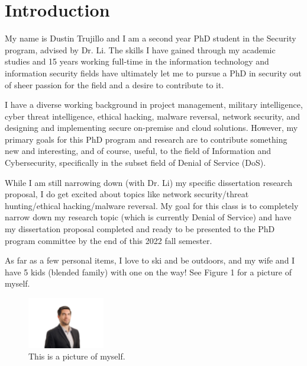 \date{}
\author{Dustin J. Trujillo}

\maketitle


\section{Introduction}

My name is Dustin Trujillo and I am a second year PhD student in the Security program, advised by Dr. Li. The skills I have gained through my academic studies and 15 years working full-time in the information technology and information security fields have ultimately let me to pursue a PhD in security out of sheer passion for the field and a desire to contribute to it.

I have a diverse working background in project management, military intelligence, cyber threat intelligence, ethical hacking, malware reversal, network security, and designing and implementing secure on-premise and cloud solutions. However, my primary goals for this PhD program and research are to contribute something new and interesting, and of course, useful, to the field of Information and Cybersecurity, specifically in the subset field of Denial of Service (DoS).

While I am still narrowing down (with Dr. Li) my specific dissertation research proposal, I do get excited about topics like network security/threat hunting/ethical hacking/malware reversal. My goal for this class is to completely narrow down my research topic (which is currently Denial of Service) and have my dissertation proposal completed and ready to be presented to the PhD program committee by the end of this 2022 fall semester.

As far as a few personal items, I love to ski and be outdoors, and my wife and I have 5 kids (blended family) with one on the way! See Figure 1 for a picture of myself.

\begin{figure}[H]
\centering
\includegraphics[width=0.3\textwidth]{trujillo.jpg}
\caption{\label{fig:Me}This is a picture of myself.}
\end{figure}


